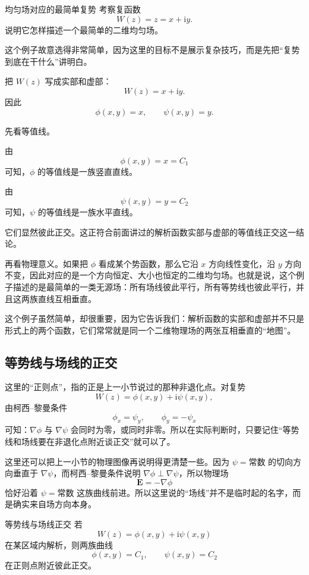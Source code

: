\begin{lizi}{均匀场对应的最简单复势}{}
考察复函数
\[
    W(z)=z=x+\mathrm{i}y.
\]
说明它怎样描述一个最简单的二维均匀场。

\begin{jie}
这个例子故意选得非常简单，因为这里的目标不是展示复杂技巧，而是先把``复势到底在干什么''讲明白。

把 $W(z)$ 写成实部和虚部：
\[
    W(z)=x+\mathrm{i}y.
\]
因此
\[
    \phi(x,y)=x,\qquad \psi(x,y)=y.
\]

先看等值线。

由
\[
    \phi(x,y)=x=C_1
\]
可知，$\phi$ 的等值线是一族竖直直线。

由
\[
    \psi(x,y)=y=C_2
\]
可知，$\psi$ 的等值线是一族水平直线。

它们显然彼此正交。这正符合前面讲过的解析函数实部与虚部的等值线正交这一结论。

再看物理意义。如果把 $\phi$ 看成某个势函数，那么它沿 $x$ 方向线性变化，沿 $y$ 方向不变，因此对应的是一个方向恒定、大小也恒定的二维均匀场。也就是说，这个例子描述的是最简单的一类无源场：所有场线彼此平行，所有等势线也彼此平行，并且这两族直线互相垂直。

这个例子虽然简单，却很重要，因为它告诉我们：解析函数的实部和虚部并不只是形式上的两个函数，它们常常就是同一个二维物理场的两张互相垂直的``地图''。
\end{jie}
\end{lizi}

\subsection{等势线与场线的正交}

这里的``正则点''，指的正是上一小节说过的那种非退化点。对复势
\[
    W(z)=\phi(x,y)+\mathrm{i}\psi(x,y),
\]
由柯西--黎曼条件
\[
    \phi_x=\psi_y,\qquad \phi_y=-\psi_x
\]
可知：$\nabla \phi$ 与 $\nabla \psi$ 会同时为零，或同时非零。所以在实际判断时，只要记住``等势线和场线要在非退化点附近谈正交''就可以了。

这里还可以把上一小节的物理图像再说明得更清楚一些。因为 $\psi=\text{常数}$ 的切向方向垂直于 $\nabla\psi$，而柯西--黎曼条件说明 $\nabla\phi\perp\nabla\psi$，所以物理场
\[
    \mathbf{E}=-\nabla\phi
\]
恰好沿着 $\psi=\text{常数}$ 这族曲线前进。所以这里说的``场线''并不是临时起的名字，而是确实来自场方向本身。

\begin{dingli}{等势线与场线正交}{}
若
\[
    W(z)=\phi(x,y)+\mathrm{i}\psi(x,y)
\]
在某区域内解析，则两族曲线
\[
    \phi(x,y)=C_1,\qquad \psi(x,y)=C_2
\]
在正则点附近彼此正交。
\end{dingli}

